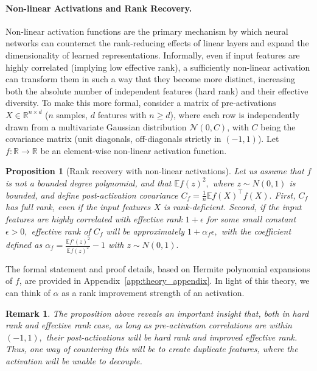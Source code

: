 \documentclass{article}
\newcommand{\R}{\mathbb{R}}
\newcommand{\E}{\mathbb{E}}
\newtheorem{proposition}{Proposition}[section]
\newtheorem{remark}{Remark}[section]
\numberwithin{figure}{section}
\begin{document}
\paragraph{Non-linear Activations and Rank Recovery.}
Non-linear activation functions are the primary mechanism by which neural networks can counteract the rank-reducing effects of linear layers and expand the dimensionality of learned representations. Informally, even if input features are highly correlated (implying low effective rank), a sufficiently non-linear activation can transform them in such a way that they become more distinct, increasing both the absolute number of independent features (hard rank) and their effective diversity.   
To make this more formal, consider a matrix of pre-activations $X \in \R^{n \times d}$ ($n$ samples, $d$ features with $n\ge d$), where each row is independently drawn from a multivariate Gaussian distribution $\mathcal{N}(0, C)$, with $C$ being the covariance matrix (unit diagonals, off-diagonals strictly in $(-1,1)$). Let $f: \R \to \R$ be an element-wise non-linear activation function.

\begin{proposition}[Rank recovery with non-linear activations]
\label{prop:rank_recovery_informal}
\label{prop:hard_rank_increase_main} %
Let us assume that  $f$ is not a bounded degree polynomial, and that $\E f(z)^2,$ where $z\sim N(0,1)$ is bounded, and define post-activation covariance $C_f = \frac1n \E f(X)^\top f(X).$ First, $C_f$ has full rank, even if the input features $X$ is rank-deficient. Second, if the input features are highly correlated with effective rank $1+\epsilon$ for some small constant $\epsilon>0,$ effective rank of $C_f$ will be approximately  $1 + \alpha_f \epsilon,$ with the coefficient defined as $\alpha_f = \frac{\E f'(z)^2}{\E f(z)^2 } - 1$ with $z\sim N(0,1).$
\end{proposition}
The formal statement and proof details, based on Hermite polynomial expansions of $f$, are provided in Appendix~\ref{app:theory_appendix}. In light of this theory, we can think of $\alpha$ as a rank improvement strength of an activation.

\begin{remark}
\label{rem:duplicate_rank}
    The proposition above reveals an important insight that, both in hard rank and effective rank case, as long as pre-activation correlations are within $(-1,1),$ their post-activations will be hard rank and improved effective rank. Thus, one way of countering this will be to create duplicate features, where the activation will be unable to decouple.
\end{remark}
\end{document}
